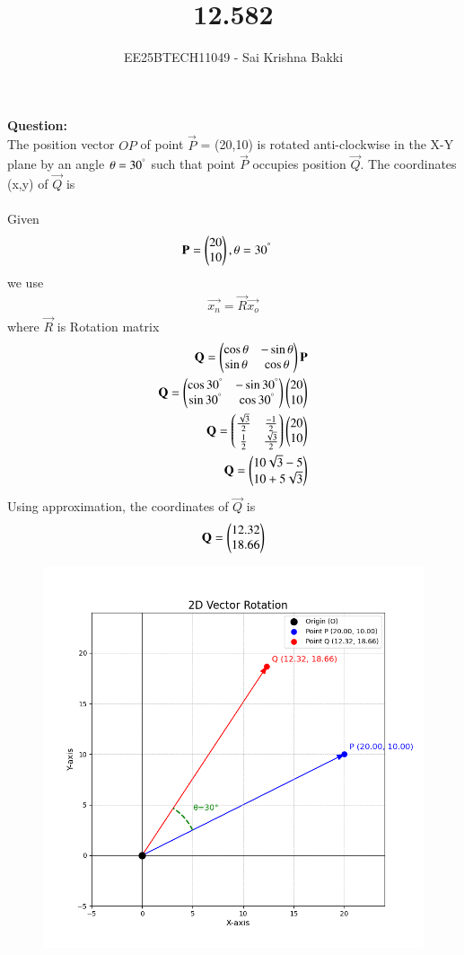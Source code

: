 \documentclass[journal]{IEEEtran}
\begin{document}

\vspace{3cm}

\title{12.582}
\author{EE25BTECH11049 - Sai Krishna Bakki}
\maketitle
\vspace{-3em}
\textbf{Question:}\\
The position vector $OP$ of point $\vec{P}$ = (20,10) is rotated anti-clockwise in the X-Y plane by an angle $\theta=30^\degree$ such that point $\vec{P}$ occupies position $\vec{Q}$. The coordinates (x,y) of $\vec{Q}$ is \\
\solution\\
Given
\begin{align}
    \mathbf{P}=\begin{pmatrix}20\\10\end{pmatrix},\theta&=30^\degree
\end{align}
we use
\begin{align}
    \vec{x_n}=\vec{R}\vec{x_o}
\end{align}
where $\vec{R}$ is Rotation matrix
\begin{align}
    \mathbf{Q}=\begin{pmatrix}\cos\theta&-\sin\theta\\ \sin\theta&\cos\theta\end{pmatrix}\mathbf{P}\\
    \mathbf{Q}=\begin{pmatrix}\cos30^\degree&-\sin30^\degree\\ \sin30^\degree&\cos30^\degree\end{pmatrix}\begin{pmatrix}20\\10\end{pmatrix}\\
    \mathbf{Q}=\begin{pmatrix}\frac{\sqrt{3}}{2}&\frac{-1}{2}\\\frac{1}{2}&\frac{\sqrt{3}}{2}\end{pmatrix}\begin{pmatrix}20\\10\end{pmatrix}\\
    \mathbf{Q}=\begin{pmatrix}10\sqrt{3}-5\\10+5\sqrt{3}\end{pmatrix}
\end{align}
Using approximation, the coordinates of $\vec{Q}$ is
\begin{align}
    \mathbf{Q}=\begin{pmatrix}12.32\\18.66\end{pmatrix}
\end{align}
\newpage
\begin{figure}
    \centering
    \includegraphics[width=1.1\columnwidth]{figs/Figure_1.png}
    \caption{}
    \label{fig:placeholder}
\end{figure}
\end{document}
